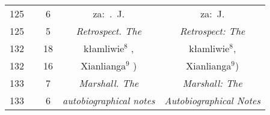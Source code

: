 \documentclass[a4paper,11pt]{article}
\numberwithin{equation}{section}
\begin{document}
\begin{center}
\begin{tabular}{|c|c|c|c|c|}
    125 & &  6 & za:~.~J. & za:~J. \\
    125 & &  5 & \textit{Retrospect. The} & \textit{Retrospect: The} \\
    132 & & 18 & kłamliwie$^{ 8 }$ , & kłamliwie$^{ 8 }$, \\
    132 & & 16 & Xianlianga$^{ 9 }$ ) & Xianlianga$^{ 9 }$) \\
    133 & &  7 & \textit{Marshall. The} & \textit{Marshall: The} \\
    133 & &  6 & \textit{autobiographical notes}
           & \textit{Autobiographical Notes} \\
    \hline
  \end{tabular}





  \newpage


\end{center}
\end{document}
